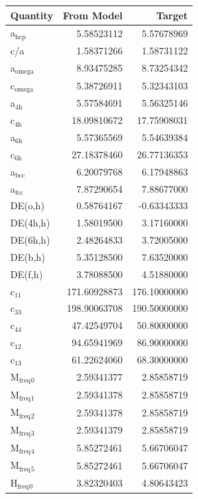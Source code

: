 \documentclass[11pt]{article}
\begin{document}
\begin{enumerate}
\begin{center}
\begin{tabular}{lrr}
Quantity & From Model & Target\\
\hline
a\(_{\text{hcp}}\) & 5.58523112 & 5.57678969\\
c/a & 1.58371266 & 1.58731122\\
a\(_{\text{omega}}\) & 8.93475285 & 8.73254342\\
c\(_{\text{omega}}\) & 5.38726911 & 5.32343103\\
a\(_{\text{4h}}\) & 5.57584691 & 5.56325146\\
c\(_{\text{4h}}\) & 18.09810672 & 17.75908031\\
a\(_{\text{6h}}\) & 5.57365569 & 5.54639384\\
c\(_{\text{6h}}\) & 27.18378460 & 26.77136353\\
a\(_{\text{bcc}}\) & 6.20079768 & 6.17948863\\
a\(_{\text{fcc}}\) & 7.87290654 & 7.88677000\\
DE(o,h) & 0.58764167 & -0.63343333\\
DE(4h,h) & 1.58019500 & 3.17160000\\
DE(6h,h) & 2.48264833 & 3.72005000\\
DE(b,h) & 5.35128500 & 7.63520000\\
DE(f,h) & 3.78088500 & 4.51880000\\
c\(_{\text{11}}\) & 171.60928873 & 176.10000000\\
c\(_{\text{33}}\) & 198.90063708 & 190.50000000\\
c\(_{\text{44}}\) & 47.42549704 & 50.80000000\\
c\(_{\text{12}}\) & 94.65941969 & 86.90000000\\
c\(_{\text{13}}\) & 61.22624060 & 68.30000000\\
M\(_{\text{freq}}\)\(_{\text{0}}\) & 2.59341377 & 2.85858719\\
M\(_{\text{freq}}\)\(_{\text{1}}\) & 2.59341378 & 2.85858719\\
M\(_{\text{freq}}\)\(_{\text{2}}\) & 2.59341378 & 2.85858719\\
M\(_{\text{freq}}\)\(_{\text{3}}\) & 2.59341379 & 2.85858719\\
M\(_{\text{freq}}\)\(_{\text{4}}\) & 5.85272461 & 5.66706047\\
M\(_{\text{freq}}\)\(_{\text{5}}\) & 5.85272461 & 5.66706047\\
H\(_{\text{freq}}\)\(_{\text{0}}\) & 3.82320403 & 4.80643423\\

\end{tabular}
\end{center}
\end{enumerate}
\end{document}
